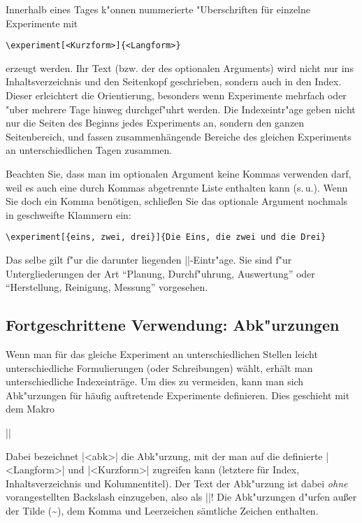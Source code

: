 \documentclass[a4paper]{article}
\begin{document}
\DescribeMacro{\experiment} Innerhalb eines Tages k"onnen nummerierte
"Uberschriften f^^fcr einzelne Experimente mit
\begin{verbatim}
\experiment[<Kurzform>]{<Langform>}
\end{verbatim}
erzeugt werden. Ihr Text (bzw. der des optionalen Arguments) wird
nicht nur ins Inhaltsverzeichnis und den Seitenkopf geschrieben,
sondern auch in den Index. Dieser erleichtert die Orientierung,
besonders wenn Experimente mehrfach oder "uber mehrere Tage hinweg
durchgef"uhrt werden. Die Indexeintr"age geben nicht nur die Seiten
des Beginns jedes Experiments an, sondern den ganzen Seitenbereich,
und fassen zusammenh^^e4ngende Bereiche des gleichen Experiments an
unterschiedlichen Tagen zusammen.

Beachten Sie, dass man im optionalen Argument keine Kommas verwenden
darf, weil es auch eine durch Kommas abgetrennte Liste enthalten kann
(s.\,u.). Wenn Sie doch ein Komma ben^^f6tigen, schlie^^dfen Sie das
optionale Argument nochmals in geschweifte Klammern ein:
\begin{verbatim}
\experiment[{eins, zwei, drei}]{Die Eins, die zwei und die Drei}
\end{verbatim}

\DescribeMacro{\subexperiment} Das selbe gilt f"ur die darunter
liegenden |\subexperiment|-Eintr"age. Sie sind f"ur Untergliederungen
der Art "`Planung, Durchf"uhrung, Auswertung"' oder "`Herstellung,
Reinigung, Messung"' vorgesehen.

\subsection{Fortgeschrittene Verwendung: Abk"urzungen}
\label{sec:abkurzungen}

\DescribeMacro{\newexperiment} Wenn man f^^fcr das gleiche Experiment an
unterschiedlichen Stellen leicht unterschiedliche Formulierungen (oder
Schreibungen) w^^e4hlt, erh^^e4lt man unterschiedliche Indexeintr^^e4ge. Um
dies zu vermeiden, kann man sich Abk"urzungen f^^fcr h^^e4ufig auftretende
Experimente definieren. Dies geschieht mit dem Makro

||

Dabei bezeichnet |<abk>| die Abk"urzung, mit der man auf die
definierte |<Langform>| und |<Kurzform>| zugreifen kann (letztere f^^fcr
Index, Inhaltsverzeichnis und Kolumnentitel). Der Text der Abk"urzung
ist dabei \emph{ohne} vorangestellten Backslash einzugeben, also als
||! Die Abk"urzungen d"urfen au^^dfer der Tilde
(\textasciitilde), dem Komma und Leerzeichen s^^e4mtliche Zeichen
enthalten.
\end{document}
